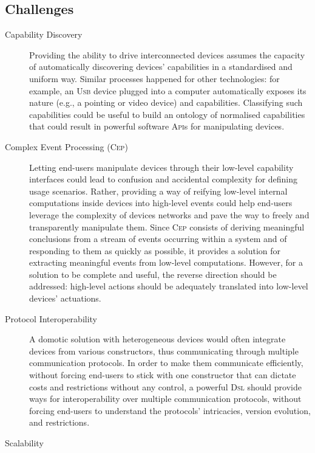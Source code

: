 \subsection{Challenges}
\label{sec:Challenges}


\begin{description}
	\item[Capability Discovery] Providing the ability to drive interconnected devices assumes the capacity of automatically discovering devices' capabilities in a standardised and uniform way. Similar processes happened for other technologies: for example, an \textsc{Usb} device plugged into a computer automatically exposes its nature (e.g., a pointing or video device) and capabilities. Classifying such capabilities could be useful to build an ontology of normalised capabilities that could result in powerful software \textsc{Api}s for manipulating devices. 
		
	\item[Complex Event Processing (\textsc{Cep})] Letting end-users manipulate devices through their low-level capability interfaces could lead to confusion and accidental complexity for defining usage scenarios. Rather, providing a way of reifying low-level internal computations inside devices into high-level events could help end-users leverage the complexity of devices networks and pave the way to freely and transparently manipulate them. Since \textsc{Cep} consists of deriving meaningful conclusions from a stream of events occurring within a system and of responding to them as quickly as possible, it provides a solution for extracting meaningful events from low-level computations. However, for a solution to be complete and useful, the reverse direction should be addressed: high-level actions should be adequately translated into low-level devices' actuations. 
		
	\item[Protocol Interoperability] A domotic solution with heterogeneous devices would often integrate devices from various constructors, thus communicating through multiple communication protocols. In order to make them communicate efficiently, without forcing end-users to stick with one constructor that can dictate costs and restrictions without any control, a powerful \textsc{Dsl} should provide ways for interoperability over multiple communication protocols, without forcing end-users to understand the protocols' intricacies, version evolution, and restrictions.
	
	\item[Scalability]
	

\end{description}
